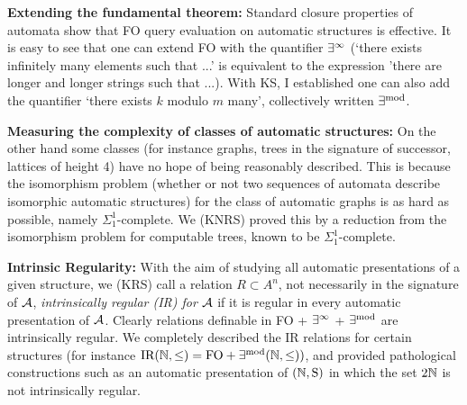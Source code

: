 \documentclass{article}
\theoremstyle{plain} \numberwithin{equation}{section}
\theoremstyle{definition}
\begin{document}
{\bf Extending the fundamental theorem:} Standard closure properties of automata show that FO query evaluation on automatic structures is effective. It is easy to see that
one can extend FO with the quantifier $\exists^{\infty}$ (`there exists infinitely many elements such that ...' is equivalent to the expression 'there are longer and longer strings such that ...). With KS, I established one can also add the quantifier `there exists $k$ modulo $m$ many', collectively written $\exists^{\text{mod}}$.

{\bf Measuring the complexity of classes of automatic structures:} 
On the other hand some classes (for instance graphs, trees in the signature of successor, lattices of height 4) have no hope of being reasonably described. This is because the isomorphism problem (whether or not two sequences of automata describe isomorphic automatic structures) for the class of automatic graphs is as hard as possible, namely $\Sigma_1^1$-complete. We (KNRS) proved this by a reduction from the isomorphism problem for computable trees, known to be $\Sigma_1^1$-complete.

{\bf Intrinsic Regularity:} With the aim of studying all automatic presentations of a given structure, we (KRS) call a relation $R \subset A^n$, not necessarily in the signature of ${\mathcal A}$, {\em intrinsically regular (IR) for ${\mathcal A}$} if it is regular in every automatic presentation of ${\mathcal A}$. Clearly relations definable in FO + $\exists^{\infty}$ + $\exists^{\text{mod}}$ are intrinsically regular. We completely described the IR relations for certain structures (for instance $\mbox{\rm IR}({\mathbb N},\leq) = \mbox{\rm FO} + \exists^{\text{mod}}({\mathbb N},\leq))$, and provided pathological constructions such as an automatic presentation of $\mbox{$({\mathbb N},\textrm{S})$}$ in which the set $2{\mathbb N}$ is not intrinsically regular.
\end{document}

